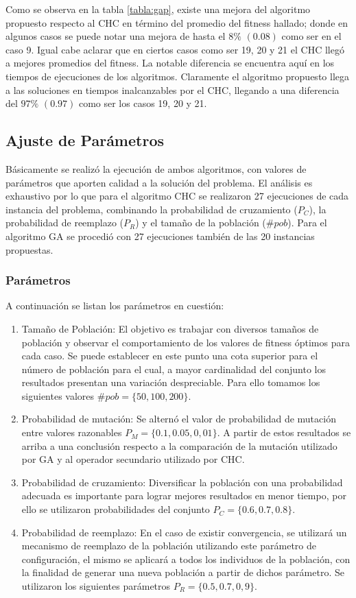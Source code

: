 \documentclass[journal]{IEEEtran}
\begin{document}
Como se observa en la tabla \ref{tabla:gap}, existe una mejora del algoritmo propuesto respecto al CHC en término del promedio del  fitness hallado; donde en algunos casos se puede notar una mejora de hasta el $8\%$ $(0.08)$ como ser en el caso 9. Igual cabe aclarar que en ciertos casos como ser  19, 20 y 21 el CHC llegó a mejores promedios del fitness. La notable diferencia se encuentra aquí en los tiempos de ejecuciones de los algoritmos. Claramente el algoritmo propuesto llega a las soluciones en tiempos inalcanzables por el CHC, llegando a una diferencia del $97\%$ $(0.97)$ como ser los casos 19, 20 y 21.

\subsection{Ajuste de Parámetros}
Básicamente se realizó la ejecución de ambos algoritmos, con valores de parámetros que aporten calidad a la solución del problema. El análisis es exhaustivo por lo que para el algoritmo CHC se realizaron 27 ejecuciones de cada instancia del problema, combinando la probabilidad de cruzamiento ($P_{C}$), la probabilidad de reemplazo ($P_{R}$) y el tamaño de la población ($\#pob$).  Para el algoritmo GA se procedió con 27 ejecuciones también de las 20 instancias propuestas.


\subsubsection{Parámetros} \label{sec:parametros}
A continuación se listan los parámetros en cuestión:
\begin{enumerate}
  \item Tamaño de Población: El objetivo es trabajar con diversos tamaños de población y observar el comportamiento de los valores de fitness óptimos para cada caso. Se puede establecer en este punto una cota superior para el número de población para el cual, a mayor cardinalidad del conjunto los resultados presentan una variación despreciable. Para ello tomamos los siguientes valores $\#pob=\{50,100,200\}$.
  \item Probabilidad de mutación: Se alternó el valor de probabilidad de mutación entre valores razonables $P_{M}=\{0.1,0.05,0,01\}$. A partir de estos resultados se arriba a una conclusión respecto a la comparación de la mutación utilizado por GA y al operador secundario utilizado por CHC.
  \item Probabilidad de cruzamiento: Diversificar la población con una probabilidad adecuada es importante para lograr mejores resultados en menor tiempo, por ello se utilizaron probabilidades del conjunto $P_{C}=\{0.6,0.7,0.8\}$.
  \item Probabilidad de reemplazo: En el caso de existir convergencia, se utilizará un mecanismo de reemplazo de la población utilizando este parámetro de configuración, el mismo se aplicará a todos los individuos de la población, con la finalidad de generar una nueva población a partir de dichos parámetro. Se utilizaron los siguientes parámetros $P_{R}=\{0.5,0.7,0,9\}$.
\end{enumerate}
\end{document}
